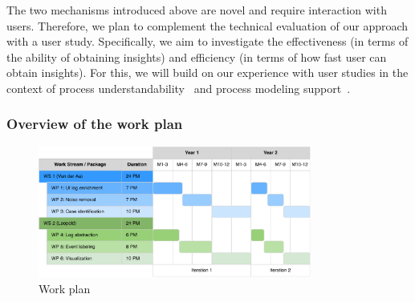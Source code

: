  The two mechanisms introduced above are novel and require interaction with users. Therefore, we plan to complement the technical evaluation of our approach with a user study. Specifically, we aim to investigate the effectiveness (in terms of the ability of obtaining insights) and efficiency (in terms of how fast user can obtain insights).  For this, we will build on our experience with user studies in the context of process understandability~\cite{pittke2015automatic} and process modeling support~\cite{van2020say}.



\subsubsection{Overview of the work plan}

\begin{figure}[bt]
\centering
	\includegraphics[width=0.8\textwidth]{./figures/Gantt.pdf}
	\caption{Work plan}
	\label{fig:workplan}
\end{figure}


